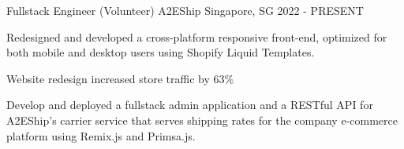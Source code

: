\begin{cventries}
  \cventry
  {Fullstack Engineer (Volunteer)} %
  {A2EShip} %
  {Singapore, SG}
  {2022 - PRESENT}
  {
    \begin{cvitems} %
      \item Redesigned and developed a cross-platform responsive front-end,
      optimized for both mobile and desktop users using Shopify Liquid Templates.
      \item Website redesign increased store traffic by 63\%
      \item Develop and deployed a fullstack admin application and a RESTful API for A2EShip's carrier service 
        that serves shipping rates for the company e-commerce platform using Remix.js and Primsa.js.
    \end{cvitems}
  }
\end{cventries}
